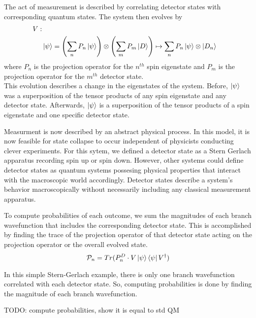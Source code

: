 The act of measurement is described by correlating detector states with corresponding quantum states. The system then evolves by
\begin{align}
    \nonumber V: \\
    & \ket{\psi} = \left(\sum_{n} P_n\ket{\psi}\right) \otimes \left(\sum_{m} P_m\ket{D}\right) \mapsto \sum_{n} P_n\ket{\psi} \otimes \ket{D_n}
\end{align}
where $P_n$ is the projection operator for the $n^{th}$ spin eigenstate and $P_m$ is the projection operator for the $m^{th}$ detector state. \\

This evolution describes a change in the eigenstates of the system. Before, $\ket{\psi}$ was a superposition of the tensor products of any spin eigenstate and any detector state. Afterwards, $\ket{\psi}$ is a superposition of the tensor products of a spin eigenstate and one specific detector state.

Measurment is now described by an abstract physical process. In this model, it is now feasible for state collapse to occur independent of physicists conducting clever experiments. For this sytem, we defined a detector state as a Stern Gerlach apparatus recording spin up or spin down. However, other systems could define detector states as quantum systems possesing physical properties that interact with the macroscopic world accordingly. Detector states describe a system's behavior macroscopically without necessarily including any classical measurement apparatus.

To compute probabilities of each outcome, we sum the magnitudes of each branch wavefunction that includes the corresponding detector state. This is accomplished by finding the trace of the projection operator of that detector state acting on the projection operator or the overall evolved state.
\begin{align}
    \mathcal{P}_n = Tr(P^D_n \cdot V\ket{\psi}\bra{\psi}V^\dagger)
\end{align}

In this simple Stern-Gerlach example, there is only one branch wavefunction correlated with each detector state. So, computing probabilities is done by finding the magnitude of each branch wavefunction.

TODO: compute probabilities, show it is equal to std QM

